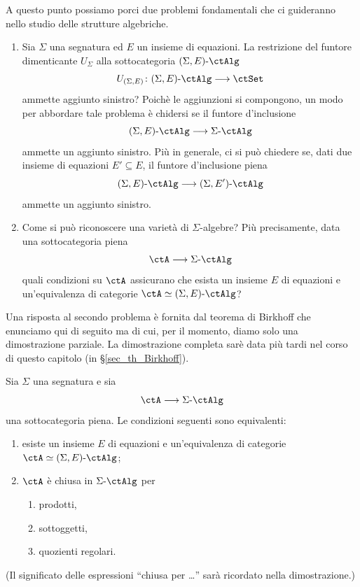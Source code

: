 A questo punto possiamo porci due problemi fondamentali che ci guideranno nello studio delle strutture algebriche.
\begin{enumerate}
 \item Sia \(\Sigma\) una segnatura ed \(E\) un insieme di equazioni. La restrizione del funtore dimenticante \(U_{\Sigma}\)
       alla sottocategoria \(\ctSEAlg\)
       \[U_{(\Sigma,E)} \colon \ctSEAlg \fun \ctSet\]
       ammette aggiunto sinistro? Poichè le aggiunzioni si compongono, un modo per abbordare tale problema è chidersi
       se il funtore d'inclusione
       \[\ctSEAlg \fun \ctSAlg\]
       ammette un aggiunto sinistro. Più in generale, ci si può chiedere se, dati due insieme di equazioni \(E' \subseteq E\),
       il funtore d'inclusione piena
       \[\ctSEAlg \fun \ctSEEAlg\]
       ammette un aggiunto sinistro.
 \item Come si può riconoscere una varietà di \(\Sigma\)-algebre? Più precisamente, data una sottocategoria piena
       \[\ctA \fun \ctSAlg\]
       quali condizioni su \(\ctA\) assicurano che esista un insieme \(E\) di equazioni e un'equivalenza di categorie \(\ctA \simeq \ctSEAlg\)?
\end{enumerate}

Una risposta al secondo problema è fornita dal teorema di Birkhoff che enunciamo qui di seguito ma di cui, per il momento,
diamo solo una dimostrazione parziale. La dimostrazione completa sarè data più tardi nel corso di questo capitolo (in
§\ref{sec_th_Birkhoff}).

\begin{theorem}\label{teo_Birkhoff_v1}
 Sia \(\Sigma\) una segnatura e sia
 \[\ctA \fun \ctSAlg\]
 una sottocategoria piena. Le condizioni seguenti sono equivalenti:
 \begin{enumerate}
  \item esiste un insieme \(E\) di equazioni e un'equivalenza di categorie \(\ctA \simeq \ctSEAlg\);
  \item \(\ctA\) è chiusa in \(\ctSAlg\) per
        \begin{enumerate}
         \item prodotti,
         \item sottoggetti,
         \item quozienti regolari.
        \end{enumerate}
 \end{enumerate}
 (Il significato delle espressioni ``chiusa per \ldots'' sarà ricordato nella dimostrazione.)
\end{theorem}

